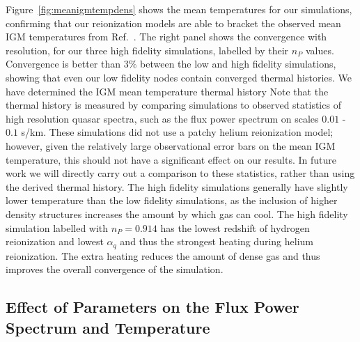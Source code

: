 \documentclass[a4paper,11pt]{article}
\begin{document}
Figure~\ref{fig:meanigmtempdens} shows the mean temperatures for our simulations, confirming that our reionization models are able to bracket the observed mean IGM temperatures from Ref.~\cite{Gaikwad:2021}. The right panel shows the convergence with resolution, for our three high fidelity simulations, labelled by their $n_P$ values. Convergence is better than $3\%$ between the low and high fidelity simulations, showing that even our low fidelity nodes contain converged thermal histories. We have determined the IGM mean temperature thermal history Note that the thermal history is measured by comparing simulations to observed statistics of high resolution quasar spectra, such as the flux power spectrum on scales $0.01$ - $0.1$ s/km. These simulations did not use a patchy helium reionization model; however, given the relatively large observational error bars on the mean IGM temperature, this should not have a significant effect on our results. In future work we will directly carry out a comparison to these statistics, rather than using the derived thermal history. The high fidelity simulations generally have slightly lower temperature than the low fidelity simulations, as the inclusion of higher density structures increases the amount by which gas can cool. The high fidelity simulation labelled with $n_P=0.914$ has the lowest redshift of hydrogen reionization and lowest $\alpha_q$ and thus the strongest heating during helium reionization. The extra heating reduces the amount of dense gas and thus improves the overall convergence of the simulation.


\subsection{Effect of Parameters on the Flux Power Spectrum and Temperature}
\label{sec:singleparams}
\end{document}
